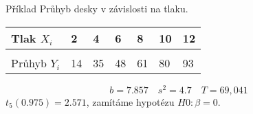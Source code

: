 \documentclass[smaller]{beamer}
\begin{document}
\begin{frame}{Příklad}
 Průhyb desky v závislosti na tlaku.
\begin{center}
\begin{tabular}{l|llllll}
Tlak $X_i$ & 2 & 4 & 6 & 8 & 10 & 12\\
\hline\\
Průhyb $Y_i$ & 14 & 35 & 48 & 61 & 80 & 93\\
\end{tabular}
\end{center}

\[
  b = 7.857\quad s^2 = 4.7\quad T = 69,041
\]
$t_5(0.975) = 2.571$, zamítáme hypotézu $H0: \beta = 0$. 

\end{frame}
\end{document}
